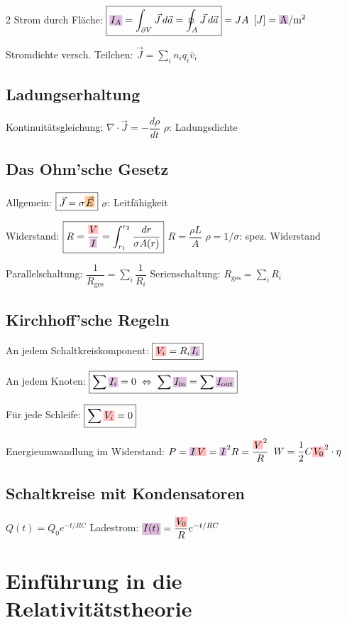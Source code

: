 \documentclass[10pt,a4paper]{article}
\newcommand{\icc}[1]{{\setlength\fboxsep{1pt}\colorbox{violet!25}{\ensuremath{#1}}}}
\newcommand{\efc}[1]{{\setlength\fboxsep{1pt}\colorbox{orange!40}{\ensuremath{#1}}}}
\newcommand{\vc}[1]{{\setlength\fboxsep{1pt}\colorbox{red!25}{\ensuremath{#1}}}}
\begin{document}
\begin{multicols}{2}
Strom durch Fläche: $\boxed{\icc{I_A}=\int_{\partial V}\vec{J}\,d\vec{a}=\oint_A\vec{J}\,d\vec{a}}=JA$ \quad $[J]=\icc{\text{A}}/\text{m}^2$

Stromdichte versch. Teilchen: $\vec{J}=\sum_i n_i q_i\bar{v}_i$

\subsection{Ladungserhaltung}

Kontinuitätsgleichung: $\boxed{\nabla\cdot\vec{J}=-\dfrac{d\rho}{dt}}$ \quad $\rho$: Ladungsdichte

\subsection{Das Ohm'sche Gesetz}

Allgemein: $\boxed{\vec{J}=\sigma\efc{\vec{E}}}$ \quad $\sigma$: Leitfähigkeit

Widerstand: $\boxed{R=\dfrac{\vc{V}}{\icc{I}}=\int_{r_1}^{r_2}\dfrac{dr}{\sigma A(r)}}$ \quad $\boxed{R=\dfrac{\rho L}{A}}$ \; $\rho=1/\sigma$: spez. Widerstand

Parallelschaltung: $\boxed{\dfrac{1}{R_{\text{ges}}}=\sum_i\dfrac{1}{R_i}}$ \quad Serienschaltung: $\boxed{R_{\text{ges}}=\sum_i R_i}$

\subsection{Kirchhoff'sche Regeln}

An jedem Schaltkreiskomponent: $\boxed{\vc{V_i}=R_i \icc{I_i}}$

An jedem Knoten: $\boxed{\sum \icc{I_i}=0\;\Leftrightarrow\;\sum \icc{I_{\text{in}}}=\sum \icc{I_{\text{out}}}}$

Für jede Schleife: $\boxed{\sum \vc{V_i}=0}$

Energieumwandlung im Widerstand: $P=\icc{I}\vc{V}=\icc{I}^2R=\dfrac{\vc{V}^2}{R}$ \quad $W=\dfrac{1}{2}C\vc{V_0}^2\cdot\eta$

\subsection{Schaltkreise mit Kondensatoren}

$Q(t)=Q_0 e^{-t/RC}$ \quad Ladestrom: $\icc{I(t)}=\dfrac{\vc{V_0}}{R}e^{-t/RC}$

\section{Einführung in die Relativitätstheorie}


\end{multicols}
\end{document}
